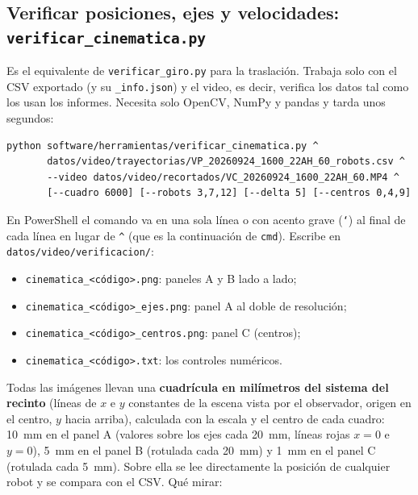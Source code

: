 \subsection{Verificar posiciones, ejes y velocidades: \texttt{verificar\_cinematica.py}}\label{sec:verif_cin}

Es el equivalente de \texttt{verificar\_giro.py} para la traslación. Trabaja solo con el CSV exportado
(y su \texttt{\_info.json}) y el video, es decir, verifica los datos tal como los usan los informes.
Necesita solo OpenCV, NumPy y pandas y tarda unos segundos:
\begin{verbatim}
python software/herramientas/verificar_cinematica.py ^
       datos/video/trayectorias/VP_20260924_1600_22AH_60_robots.csv ^
       --video datos/video/recortados/VC_20260924_1600_22AH_60.MP4 ^
       [--cuadro 6000] [--robots 3,7,12] [--delta 5] [--centros 0,4,9]
\end{verbatim}
En PowerShell el comando va en una sola línea o con acento grave (\texttt{`}) al final de cada línea en
lugar de \texttt{\^{}} (que es la continuación de \texttt{cmd}). Escribe en
\nolinkurl{datos/video/verificacion/}:
\begin{itemize}
  \item \nolinkurl{cinematica_<código>.png}: paneles A y B lado a lado;
  \item \nolinkurl{cinematica_<código>_ejes.png}: panel A al doble de resolución;
  \item \nolinkurl{cinematica_<código>_centros.png}: panel C (centros);
  \item \nolinkurl{cinematica_<código>.txt}: los controles numéricos.
\end{itemize}
Todas las imágenes llevan una \textbf{cuadrícula en milímetros del sistema del recinto} (líneas de $x$ e
$y$ constantes de la escena vista por el observador, origen en el centro, $y$ hacia arriba), calculada con la escala y el centro
de cada cuadro: \SI{10}{\milli\metre} en el panel A (valores sobre los ejes cada \SI{20}{\milli\metre},
líneas rojas $x=0$ e $y=0$), \SI{5}{\milli\metre} en el panel B (rotulada cada \SI{20}{\milli\metre}) y
\SI{1}{\milli\metre} en el panel C (rotulada cada \SI{5}{\milli\metre}). Sobre ella se lee directamente
la posición de cualquier robot y se compara con el CSV. Qué mirar:
